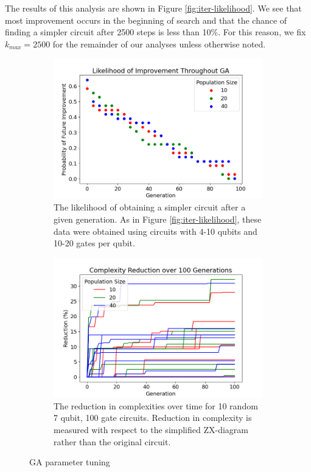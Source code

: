The results of this analysis are shown in Figure \ref{fig:iter-likelihood}.
We see that most improvement occurs in the beginning of search and that the chance of finding a simpler circuit after 2500 steps is less than 10\%.
For this reason, we fix $k_{max} = 2500$ for the remainder of our analyses unless otherwise noted.


\begin{figure}
\centering
\begin{subfigure}[t]{0.47\textwidth}
  \centering
  \includegraphics[width=\linewidth]{img/ga-likelihood.png}
  \caption{The likelihood of obtaining a simpler circuit after a given generation.
  As in Figure \ref{fig:iter-likelihood}, these data were obtained using circuits with 4-10 qubits and 10-20 gates per qubit.}
  \label{fig:ga-likelihood}
\end{subfigure}
\hfill
\begin{subfigure}[t]{0.47\textwidth}
  \centering
  \includegraphics[width=\linewidth]{img/7qb}
  \caption{
    The reduction in complexities over time for 10 random 7 qubit, 100 gate circuits.
    Reduction in complexity is measured with respect to the simplified ZX-diagram rather than the original circuit.
  }
  \label{fig:7qb}
\end{subfigure}
\caption{
  GA parameter tuning
}
\label{fig:ga-params}
\end{figure}


